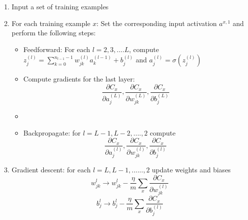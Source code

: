 \begin{enumerate}
    \item Input a set of training examples 
    \item For each training example $x$: Set the corresponding input activation $a^{x,1}$ and perform the following steps:
    \begin{itemize}
        \item Feedforward: For each $l = 2,3,....L$, compute $z_j^{(l)} = \sum_{k=0}^{n_{l-1} -1} w_{jk}^{(l)} a_k^{(l-1)} + b_j^{(l)}$ and $a_j^{(l)} = \sigma (z_j^{(l)})$
        \item Compute gradients for the last layer: $$\frac{\partial C_x}{\partial a_j^{(L)}}, \frac{\partial C_x}{\partial w_{jk}^{(L)}}, \frac{\partial C_x}{\partial b_j^{(L)}}$$
        \item \item Backpropagate: for $l = L-1, L-2, ...., 2$ compute $$\frac{\partial C_x}{\partial a_j^{(l)}}, \frac{\partial C_x}{\partial w_{jk}^{(l)}}, \frac{\partial C_x}{\partial b_j^{(l)}}$$
    \end{itemize}
    \item Gradient descent: for each $l = L, L-1, ......, 2$ update weights and biases
        $$w_{jk}^l \rightarrow w_{jk}^l - \frac{\eta}{m} \sum_x \frac{\partial C_x}{\partial w_{jk}^{(l)}} $$
        $$b_j^l \rightarrow b_j^l - \frac{\eta}{m} \sum_x \frac{\partial C_x}{\partial b_j^{(l)}} $$
\end{enumerate}
